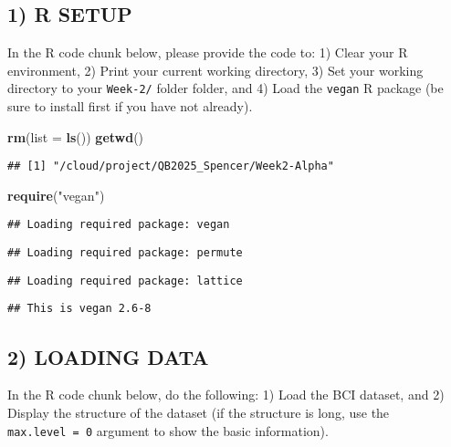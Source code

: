 \documentclass[
]{article}
\newenvironment{Shaded}{\begin{snugshade}}{\end{snugshade}}
\newcommand{\AttributeTok}[1]{\textcolor[rgb]{0.13,0.29,0.53}{#1}}
\newcommand{\FunctionTok}[1]{\textcolor[rgb]{0.13,0.29,0.53}{\textbf{#1}}}
\newcommand{\NormalTok}[1]{#1}
\newcommand{\StringTok}[1]{\textcolor[rgb]{0.31,0.60,0.02}{#1}}
\begin{document}
\subsection{1) R SETUP}\label{r-setup}

In the R code chunk below, please provide the code to: 1) Clear your R
environment, 2) Print your current working directory, 3) Set your
working directory to your \texttt{Week-2/} folder folder, and 4) Load
the \texttt{vegan} R package (be sure to install first if you have not
already).

\begin{Shaded}
\begin{Highlighting}[]
\FunctionTok{rm}\NormalTok{(}\AttributeTok{list =} \FunctionTok{ls}\NormalTok{())}
\FunctionTok{getwd}\NormalTok{()}
\end{Highlighting}
\end{Shaded}

\begin{verbatim}
## [1] "/cloud/project/QB2025_Spencer/Week2-Alpha"
\end{verbatim}

\begin{Shaded}
\begin{Highlighting}[]
\FunctionTok{require}\NormalTok{(}\StringTok{"vegan"}\NormalTok{)}
\end{Highlighting}
\end{Shaded}

\begin{verbatim}
## Loading required package: vegan
\end{verbatim}

\begin{verbatim}
## Loading required package: permute
\end{verbatim}

\begin{verbatim}
## Loading required package: lattice
\end{verbatim}

\begin{verbatim}
## This is vegan 2.6-8
\end{verbatim}

\subsection{2) LOADING DATA}\label{loading-data}

In the R code chunk below, do the following: 1) Load the BCI dataset,
and 2) Display the structure of the dataset (if the structure is long,
use the \texttt{max.level\ =\ 0} argument to show the basic
information).
\end{document}
